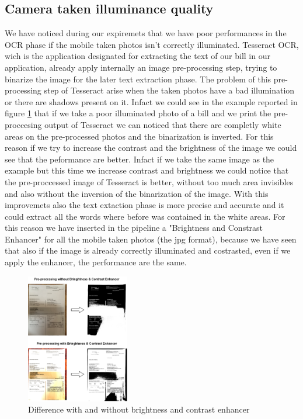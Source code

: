 \documentclass[10pt,twocolumn,letterpaper]{article}
\begin{document}
\subsection{Camera taken illuminance quality}
We have noticed during our expiremets that we have poor performances in the OCR phase if the mobile taken photos isn't correctly illuminated. Tesseract OCR, wich is the application designated for extracting the text of our bill in our application, already apply internally an image pre-processing step, trying to binarize the image for the later text extraction phase. The problem of this pre-processing step of Tesseract arise when the taken photos have a bad illumination or there are shadows present on it. Infact we could see in the example reported in figure \ref{bright-constrast-experiment} that if we take a poor illuminated photo of a bill and we print the pre-proccesing output of Tesseract we can noticed that there are completly white areas on the pre-processed photos and the binarization is inverted. For this reason if we try to increase the contrast and the brightness of the image we could see that the peformance are better. Infact if we take the same image as the example but this time we increase contrast and brightness we could notice that the pre-proccessed image of Tesseract is better, without too much area invisibles and also without the inversion of the binarization of the image. With this improvemets also the text extaction phase is more precise and accurate and it could extract all the words where before was contained in the white areas. For this reason we have inserted in the pipeline a "Brightness and Constrast Enhancer" for all the mobile taken photos (the jpg format), because we have seen that also if the image is already correctly illuminated and costrasted, even if we apply the enhancer, the performance are the same.

\begin{figure}[h]
	\centering
	\includegraphics[width=0.4\textwidth]{images/bright-contrast-experiment.png}
	\caption{Difference with and without brightness and contrast enhancer}
	\label{bright-constrast-experiment}
\end{figure}
\end{document}
